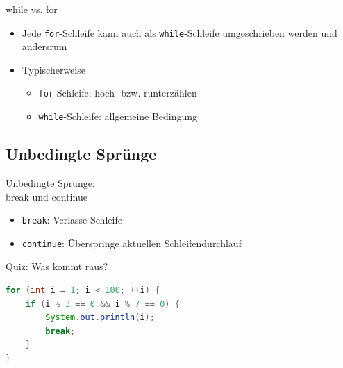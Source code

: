 \documentclass[18pt]{beamer}
\begin{document}
\begin{frame}{while vs. for}
    \begin{itemize}
        \item Jede \texttt{for}-Schleife kann auch als \texttt{while}-Schleife umgeschrieben werden und andersrum
        \pause
        \vspace{.3in}
        \item Typischerweise
        \begin{itemize}
            \item \texttt{for}-Schleife: hoch- bzw. runterzählen
            \item \texttt{while}-Schleife: allgemeine Bedingung
        \end{itemize}
    \end{itemize}
\end{frame}

\subsection{Unbedingte Sprünge}

\begin{frame}[fragile]{Unbedingte Sprünge:\\ break und continue}
    \begin{block}{}
        \begin{itemize}
            \item \texttt{break}: Verlasse Schleife
            \item \texttt{continue}: Überspringe aktuellen Schleifendurchlauf
        \end{itemize}
    \end{block}
\end{frame}

\begin{frame}[fragile]{Quiz: Was kommt raus?}
    \begin{exampleblock}{}
        \begin{lstlisting}[language=Java]
for (int i = 1; i < 100; ++i) {
    if (i % 3 == 0 && i % 7 == 0) {
        System.out.println(i);
        break;
    }
}
        \end{lstlisting}
    \end{exampleblock}
\end{frame}
\end{document}
